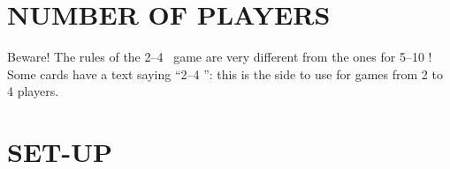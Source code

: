 
\section{NUMBER OF PLAYERS}

    Beware! The rules of the 2–4 \faPeopleGroup\ game are very different from the ones for 5–10 \faPeopleGroup! Some
    cards have a text saying “2–4 \faPeopleGroup”: this is the side to use for games from 2 to 4 players.



\section{SET-UP}

